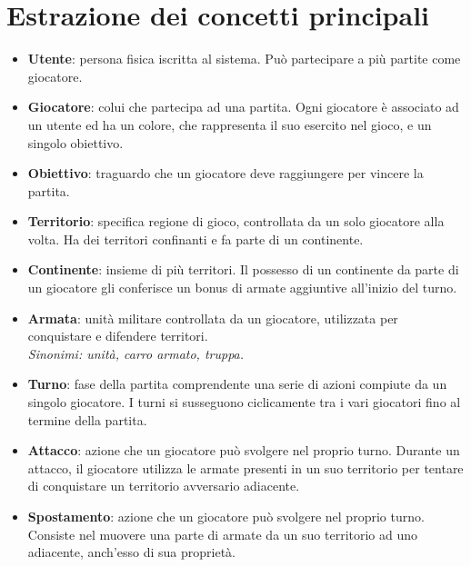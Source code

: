 \documentclass[a4paper,12pt]{report}
\begin{document}
\section{Estrazione dei concetti principali}

\begin{itemize}
    \item \textbf{Utente}: persona fisica iscritta al sistema. Può partecipare a più partite come giocatore.
    \item \textbf{Giocatore}: colui che partecipa ad una partita. Ogni giocatore è associato ad un utente ed ha un colore, che rappresenta il suo esercito nel gioco, e un singolo obiettivo.
    \item \textbf{Obiettivo}: traguardo che un giocatore deve raggiungere per vincere la partita.
    \item \textbf{Territorio}: specifica regione di gioco, controllata da un solo giocatore alla volta. Ha dei territori confinanti e fa parte di un continente.
    \item \textbf{Continente}: insieme di più territori. Il possesso di un continente da parte di un giocatore gli conferisce un bonus di armate aggiuntive all’inizio del turno.
    \item \textbf{Armata}: unità militare controllata da un giocatore, utilizzata per conquistare e difendere territori. \\\textit{Sinonimi: unità, carro armato, truppa.}
    \item \textbf{Turno}: fase della partita comprendente una serie di azioni compiute da un singolo giocatore. I turni si susseguono ciclicamente tra i vari giocatori fino al termine della partita.
    \item \textbf{Attacco}: azione che un giocatore può svolgere nel proprio turno. Durante un attacco, il giocatore utilizza le armate presenti in un suo territorio per tentare di conquistare un territorio avversario adiacente.
    \item \textbf{Spostamento}: azione che un giocatore può svolgere nel proprio turno. Consiste nel muovere una parte di armate da un suo territorio ad uno adiacente, anch’esso di sua proprietà.

\end{itemize}
\end{document}
